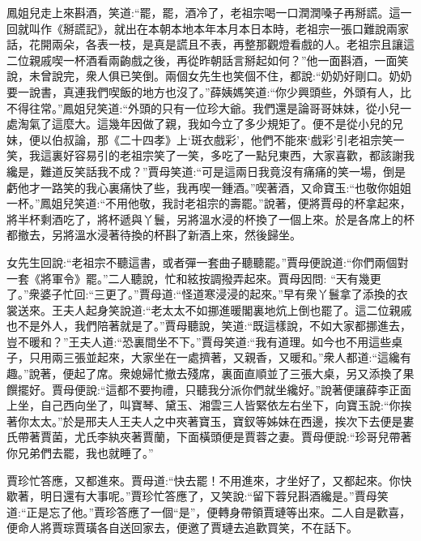\begin{parag}
    鳳姐兒走上來斟酒，笑道:“罷，罷，酒冷了，老祖宗喝一口潤潤嗓子再掰謊。這一回就叫作《掰謊記》，就出在本朝本地本年本月本日本時，老祖宗一張口難說兩家話，花開兩朵，各表一枝，是真是謊且不表，再整那觀燈看戲的人。老祖宗且讓這二位親戚喫一杯酒看兩齣戲之後，再從昨朝話言掰起如何？”他一面斟酒，一面笑說，未曾說完，衆人俱已笑倒。兩個女先生也笑個不住，都說:“奶奶好剛口。奶奶要一說書，真連我們喫飯的地方也沒了。”薛姨媽笑道:“你少興頭些，外頭有人，比不得往常。”鳳姐兒笑道:“外頭的只有一位珍大爺。我們還是論哥哥妹妹，從小兒一處淘氣了這麼大。這幾年因做了親，我如今立了多少規矩了。便不是從小兒的兄妹，便以伯叔論，那《二十四孝》上‘斑衣戲彩’，他們不能來‘戲彩’引老祖宗笑一笑，我這裏好容易引的老祖宗笑了一笑，多吃了一點兒東西，大家喜歡，都該謝我纔是，難道反笑話我不成？”賈母笑道:“可是這兩日我竟沒有痛痛的笑一場，倒是虧他才一路笑的我心裏痛快了些，我再喫一鍾酒。”喫著酒，又命寶玉:“也敬你姐姐一杯。”鳳姐兒笑道:“不用他敬，我討老祖宗的壽罷。”說著，便將賈母的杯拿起來，將半杯剩酒吃了，將杯遞與丫鬟，另將溫水浸的杯換了一個上來。於是各席上的杯都撤去，另將溫水浸著待換的杯斟了新酒上來，然後歸坐。
\end{parag}


\begin{parag}
    女先生回說:“老祖宗不聽這書，或者彈一套曲子聽聽罷。”賈母便說道:“你們兩個對一套《將軍令》罷。”二人聽說，忙和絃按調撥弄起來。賈母因問: “天有幾更了。”衆婆子忙回:“三更了。”賈母道:“怪道寒浸浸的起來。”早有衆丫鬟拿了添換的衣裳送來。王夫人起身笑說道:“老太太不如挪進暖閣裏地炕上倒也罷了。這二位親戚也不是外人，我們陪著就是了。”賈母聽說，笑道:“既這樣說，不如大家都挪進去，豈不暖和？”王夫人道:“恐裏間坐不下。”賈母笑道:“我有道理。如今也不用這些桌子，只用兩三張並起來，大家坐在一處擠著，又親香，又暖和。”衆人都道:“這纔有趣。”說著，便起了席。衆媳婦忙撤去殘席，裏面直順並了三張大桌，另又添換了果饌擺好。賈母便說:“這都不要拘禮，只聽我分派你們就坐纔好。”說著便讓薛李正面上坐，自己西向坐了，叫寶琴、黛玉、湘雲三人皆緊依左右坐下，向寶玉說:“你挨著你太太。”於是邢夫人王夫人之中夾著寶玉，寶釵等姊妹在西邊，挨次下去便是婁氏帶著賈菌，尤氏李紈夾著賈蘭，下面橫頭便是賈蓉之妻。賈母便說:“珍哥兒帶著你兄弟們去罷，我也就睡了。”
\end{parag}


\begin{parag}
    賈珍忙答應，又都進來。賈母道:“快去罷！不用進來，才坐好了，又都起來。你快歇著，明日還有大事呢。”賈珍忙答應了，又笑說:“留下蓉兒斟酒纔是。”賈母笑道:“正是忘了他。”賈珍答應了一個“是”，便轉身帶領賈璉等出來。二人自是歡喜，便命人將賈琮賈璜各自送回家去，便邀了賈璉去追歡買笑，不在話下。
\end{parag}


